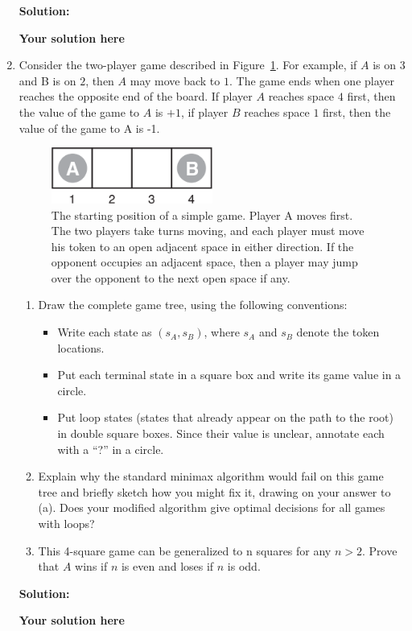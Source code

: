 \documentclass[12pt,letterpaper,pdftex]{report}
\theoremstyle{definition}
\begin{document}
\begin{enumerate}
\noindent \textbf{Solution:}

\textbf{Your solution here}





\item Consider the two-player game described in Figure~\ref{fig:definegame}. For example, if $A$ is on $3$ and B is on $2$, then $A$ may move back to $1$. The game ends when one player reaches the opposite end of the board. If
player $A$ reaches space $4$ first, then the value of the game to $A$ is $+1$, if player $B$ reaches
space $1$ first, then the value of the game to A is -1.
\begin{figure}[ht]
	\centering
	\includegraphics[width=0.5\textwidth]{week6images/defined_game.png}
	\caption{The starting position of a simple game. Player A moves first. The two players take turns moving, and each player must move his token to an open adjacent space in either direction. If the opponent occupies an adjacent space, then a player may jump over the opponent to the next open space if any.}
	\label{fig:definegame}
\end{figure}
\begin{enumerate}
	\item Draw the complete game tree, using the following conventions:
	\begin{itemize}
		\item Write each state as $(s_A, s_B)$, where $s_A$ and $s_B$ denote the token locations.
		\item Put each terminal state in a square box and write its game value in a circle.
		\item Put loop states (states that already appear on the path to the root) in double square
		boxes. Since their value is unclear, annotate each with a “?” in a circle.
	\end{itemize}
	\item Explain why the standard minimax algorithm would fail on this game tree and briefly
	sketch how you might fix it, drawing on your answer to (a). Does your modified algorithm give optimal decisions for all games with loops?
	\item This 4-square game can be generalized to n squares for any $n > 2$. Prove that $A$ wins
	if $n$ is even and loses if $n$ is odd.
\end{enumerate}


\noindent \textbf{Solution:}

\textbf{Your solution here}

\end{enumerate}
\end{document}
